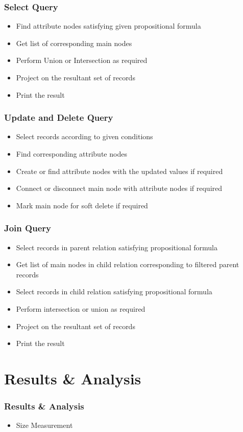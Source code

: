 \documentclass[14pt,xcolor=dvipsnames]{beamer}
\begin{document}
\begin{frame}
 \frametitle{Select Query}
 \begin{itemize}
  \item<1-> Find attribute nodes satisfying given propositional formula
  \item<2-> Get list of corresponding main nodes
  \item<3-> Perform Union or Intersection as required
  \item<4-> Project on the resultant set of records
  \item<5-> Print the result
 \end{itemize}
\end{frame}

\begin{frame}
 \frametitle{Update and Delete Query}
 \begin{itemize}
  \item<1-> Select records according to given conditions
  \item<2-> Find corresponding attribute nodes
  \item<3-> Create or find attribute nodes with the updated values if required
  \item<4-> Connect or disconnect main node with attribute nodes if required
  \item<5-> Mark main node for soft delete if required
 \end{itemize}
\end{frame}

\begin{frame}
 \frametitle{Join Query}
 \begin{itemize}
  \item<1-> Select records in parent relation satisfying propositional formula
  \item<2-> Get list of main nodes in child relation corresponding to filtered parent records
  \item<3-> Select records in child relation satisfying propositional formula
  \item<4-> Perform intersection or union as required
  \item<5-> Project on the resultant set of records
  \item<6-> Print the result
 \end{itemize}
\end{frame}

\section{Results \& Analysis}
\begin{frame}
 \frametitle{Results \& Analysis}
 \begin{itemize}
  \item Size Measurement
 \end{itemize}
\end{frame}
\end{document}
